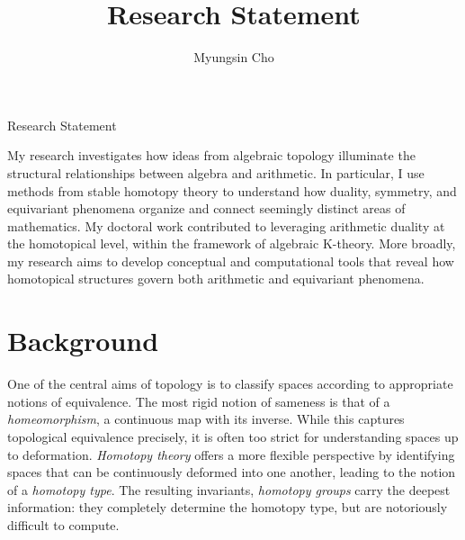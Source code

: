 \documentclass[11pt]{article}
\title{Research Statement}
\author{Myungsin Cho}
\date{}
\begin{document}
\begin{center}\LARGE{Research Statement}\end{center}\vspace{.5em}

My research investigates how ideas from algebraic topology illuminate the structural relationships between algebra and arithmetic.
In particular, I use methods from stable homotopy theory to understand how duality, symmetry, and equivariant phenomena organize and connect seemingly distinct areas of mathematics.
My doctoral work contributed to leveraging arithmetic duality at the homotopical level, within the framework of algebraic K-theory.
More broadly, my research aims to develop conceptual and computational tools that reveal how homotopical structures govern both arithmetic and equivariant phenomena.

\section{Background}
One of the central aims of topology is to classify spaces according to appropriate notions of equivalence.  
The most rigid notion of sameness is that of a {\it homeomorphism}, a continuous map with its inverse.  
While this captures topological equivalence precisely, it is often too strict for understanding spaces up to deformation.  
{\it Homotopy theory} offers a more flexible perspective by identifying spaces that can be continuously deformed into one another, leading to the notion of a {\it homotopy type}.  
The resulting invariants, {\it homotopy groups} carry the deepest information: they completely determine the homotopy type, but are notoriously difficult to compute.
\end{document}
